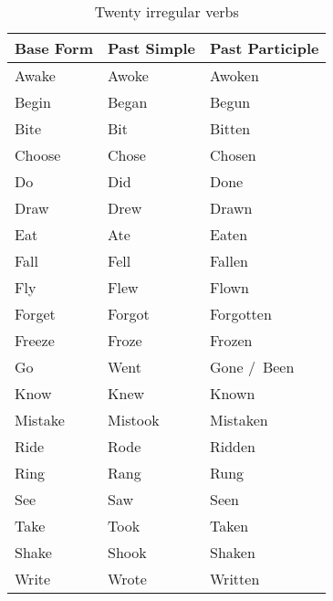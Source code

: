 \documentclass[a4paper, twoside, 12pt]{book}
\begin{document}
\begin{table}[!htbp]
	\caption{\\Twenty irregular verbs}
	\vspace{-15pt}
	\begin{center}
		\begin{tabu} to 0.9\textwidth { | X[l] | X[l] | X[l] | }
			\hline
			\textbf{Base Form} & \textbf{Past Simple} & \textbf{Past Participle} \\
			\hline
			Awake              & Awoke                & Awoken                   \\
			\hline
			Begin              & Began                & Begun                    \\
			\hline
			Bite               & Bit                  & Bitten                   \\
			\hline
			Choose             & Chose                & Chosen                   \\
			\hline
			Do                 & Did                  & Done                     \\
			\hline
			Draw               & Drew                 & Drawn                    \\
			\hline
			Eat                & Ate                  & Eaten                    \\
			\hline
			Fall               & Fell                 & Fallen                   \\
			\hline
			Fly                & Flew                 & Flown                    \\
			\hline
			Forget             & Forgot               & Forgotten                \\
			\hline
			Freeze             & Froze                & Frozen                   \\
			\hline
			Go                 & Went                 & Gone /\ Been             \\
			\hline
			Know               & Knew                 & Known                    \\
			\hline
			Mistake            & Mistook              & Mistaken                 \\
			\hline
			Ride               & Rode                 & Ridden                   \\
			\hline
			Ring               & Rang                 & Rung                     \\
			\hline
			See                & Saw                  & Seen                     \\
			\hline
			Take               & Took                 & Taken                    \\
			\hline
			Shake              & Shook                & Shaken                   \\
			\hline
			Write              & Wrote                & Written                  \\
			\hline
		\end{tabu}
	\end{center}
\end{table}
\end{document}
